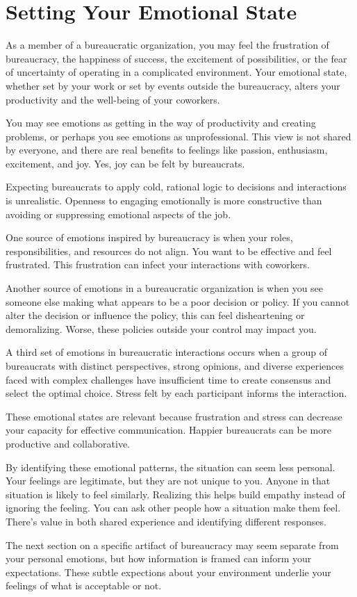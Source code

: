 \section{Setting Your Emotional State}

As a member of a bureaucratic organization, you may feel the frustration of bureaucracy, the happiness of success, the excitement of possibilities, or the fear of uncertainty of operating in a complicated environment. Your emotional state, whether set by your work or set by events outside the bureaucracy, alters your productivity and the well-being of your coworkers. 

You may see emotions as getting in the way of productivity and creating problems, or perhaps you see emotions as unprofessional. This view is not shared by everyone, and there are real benefits to feelings like passion, enthusiasm, excitement, and joy. Yes, joy can be felt by bureaucrats. 

Expecting bureaucrats to apply cold, rational logic to decisions and interactions is unrealistic. Openness to engaging emotionally is more constructive than avoiding or suppressing emotional aspects of the job. 

One source of emotions inspired by bureaucracy is when your roles, responsibilities, and resources do not align. You want to be effective and feel frustrated. This frustration can infect your interactions with coworkers. 

Another source of emotions in a bureaucratic organization is when you see someone else making what appears to be a poor decision or policy. If you cannot alter the decision or influence the policy, this can feel disheartening or demoralizing. Worse, these policies outside your control may impact you. 

A third set of emotions in bureaucratic interactions occurs when a group of bureaucrats with distinct perspectives, strong opinions, and diverse experiences faced with complex challenges have insufficient time to create consensus and select the optimal choice. Stress felt by each participant informs the interaction. 

These emotional states are relevant because frustration and stress can decrease your capacity for effective communication. Happier bureaucrats can be more productive and collaborative. 

By identifying these emotional patterns, the situation can seem less personal. Your feelings are legitimate, but they are not unique to you. Anyone in that situation is likely to feel similarly. Realizing this helps build empathy instead of ignoring the feeling.  You can ask other people how a situation make them feel. There's value in both shared experience and identifying different responses. 

The next section on a specific artifact of bureaucracy may seem separate from your personal emotions, but how information is framed can inform your expectations. These subtle expections about your environment underlie your feelings of what is acceptable or not.